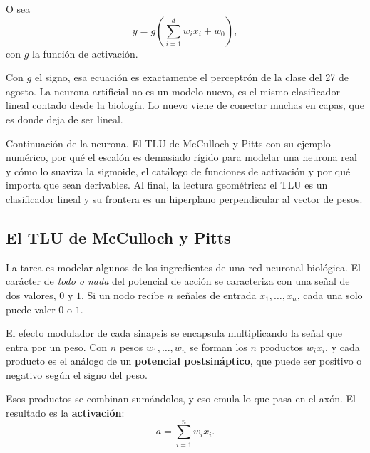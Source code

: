 \documentclass[11pt,letterpaper]{article}
\begin{document}
O sea
\[
    y = g\!\left( \sum_{i=1}^{d} w_i x_i + w_0 \right) ,
\]
con $g$ la función de activación.

\begin{idea}
  Con $g$ el signo, esa ecuación es exactamente el perceptrón de la
  clase del 27 de agosto. La neurona artificial no es un modelo nuevo,
  es el mismo clasificador lineal contado desde la biología. Lo nuevo
  viene de conectar muchas en capas, que es donde deja de ser lineal.
\end{idea}



\newpage



\begin{quick_sum}
    Continuación de la neurona. El TLU de McCulloch y Pitts con su
    ejemplo numérico, por qué el escalón es demasiado rígido para
    modelar una neurona real y cómo lo suaviza la sigmoide, el
    catálogo de funciones de activación y por qué importa que sean
    derivables. Al final, la lectura geométrica: el TLU es un
    clasificador lineal y su frontera es un hiperplano perpendicular
    al vector de pesos.
\end{quick_sum}

\subsection*{El TLU de McCulloch y Pitts}

La tarea es modelar algunos de los ingredientes de una red neuronal
biológica. El carácter de \emph{todo o nada} del potencial de acción
se caracteriza con una señal de dos valores, $0$ y $1$. Si un nodo
recibe $n$ señales de entrada $x_1, \ldots, x_n$, cada una solo puede
valer $0$ o $1$.

El efecto modulador de cada sinapsis se encapsula multiplicando la
señal que entra por un peso. Con $n$ pesos $w_1, \ldots, w_n$ se
forman los $n$ productos $w_i x_i$, y cada producto es el análogo de
un \textbf{potencial postsináptico}, que puede ser positivo o
negativo según el signo del peso.

Esos productos se combinan sumándolos, y eso emula lo que pasa en el
axón. El resultado es la \textbf{activación}:
\[
    a = \sum_{i=1}^{n} w_i x_i .
\]
\end{document}
